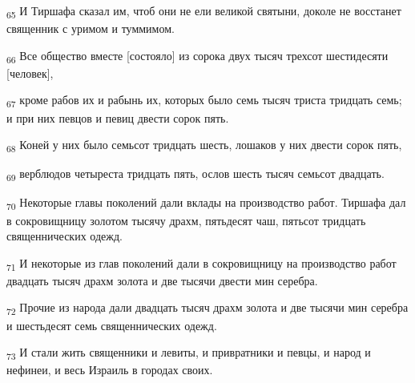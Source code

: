 \begin{tcolorbox}
\textsubscript{65} И Тиршафа сказал им, чтоб они не ели великой святыни, доколе не восстанет священник с уримом и туммимом.
\end{tcolorbox}
\begin{tcolorbox}
\textsubscript{66} Все общество вместе [состояло] из сорока двух тысяч трехсот шестидесяти [человек],
\end{tcolorbox}
\begin{tcolorbox}
\textsubscript{67} кроме рабов их и рабынь их, которых было семь тысяч триста тридцать семь; и при них певцов и певиц двести сорок пять.
\end{tcolorbox}
\begin{tcolorbox}
\textsubscript{68} Коней у них было семьсот тридцать шесть, лошаков у них двести сорок пять,
\end{tcolorbox}
\begin{tcolorbox}
\textsubscript{69} верблюдов четыреста тридцать пять, ослов шесть тысяч семьсот двадцать.
\end{tcolorbox}
\begin{tcolorbox}
\textsubscript{70} Некоторые главы поколений дали вклады на производство работ. Тиршафа дал в сокровищницу золотом тысячу драхм, пятьдесят чаш, пятьсот тридцать священнических одежд.
\end{tcolorbox}
\begin{tcolorbox}
\textsubscript{71} И некоторые из глав поколений дали в сокровищницу на производство работ двадцать тысяч драхм золота и две тысячи двести мин серебра.
\end{tcolorbox}
\begin{tcolorbox}
\textsubscript{72} Прочие из народа дали двадцать тысяч драхм золота и две тысячи мин серебра и шестьдесят семь священнических одежд.
\end{tcolorbox}
\begin{tcolorbox}
\textsubscript{73} И стали жить священники и левиты, и привратники и певцы, и народ и нефинеи, и весь Израиль в городах своих.
\end{tcolorbox}
